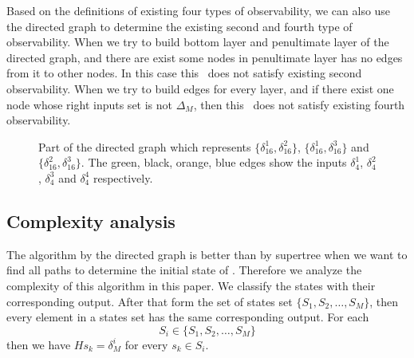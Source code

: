 Based on the definitions of existing four types of observability, we can also use the directed graph to determine the existing second and fourth type of observability. When we try to build bottom layer and penultimate layer of the directed graph, and there are exist some nodes in penultimate layer has no edges from it to other nodes. In this case this \BCN\ does not satisfy existing second observability. When we try to build edges for every layer, and if there exist one node whose right inputs set is not $\Delta_M$, then this \BCN\ does not satisfy existing fourth observability.
\begin{figure}[thpb]
      \centering
      
      \caption{Part of the directed graph which represents $\{\delta_{16}^1,\delta_{16}^2\}$, $\{\delta_{16}^1,\delta_{16}^3\}$ and $\{\delta_{16}^2,\delta_{16}^3\}$. The green, black, orange, blue edges show the inputs $\delta_4^1$, $\delta_4^2$, $\delta_4^3$ and $\delta_4^4$ respectively.}
      \label{fig:4}
   \end{figure}
\subsection{Complexity analysis}
The algorithm by the directed graph is better than by supertree when we want to find all paths to determine the initial state of \BCNs. Therefore we analyze the complexity of this algorithm in this paper. We classify the states with their corresponding output. After that form the set of states set $\{S_1, S_2,\ldots,S_M\}$,  then every element in a states set has the same corresponding output. For each 
\[S_i\in\{S_1, S_2,\ldots,S_M\}\]
 then we have $Hs_k=\delta_{M}^i$ for every $s_k\in S_i$.

